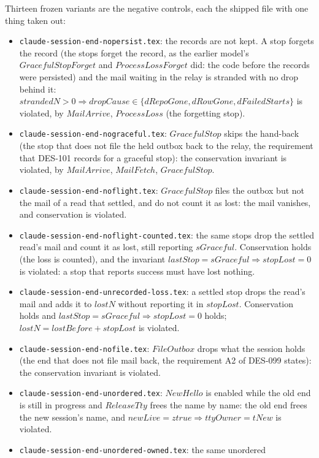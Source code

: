 \documentclass[a4paper,10pt,fleqn]{article}
\begin{document}
Thirteen frozen variants are the negative controls, each the shipped file with one
thing taken out:
\begin{itemize}
  \item \texttt{claude-session-end-nopersist.tex}: the records are not kept.  A stop forgets the
    record (the stops forget the record, as the earlier model's $GracefulStopForget$ and $ProcessLossForget$ did: the code before
    the records were persisted) and the mail waiting in the relay is stranded with no drop
    behind it: $strandedN > 0 \Rightarrow dropCause \in \{ dRepoGone, dRowGone, dFailedStarts \}$ is
    violated, by $MailArrive$, $ProcessLoss$ (the forgetting stop).
  \item \texttt{claude-session-end-nograceful.tex}: $GracefulStop$ skips the hand-back (the stop that does not file the held
    outbox back to the relay, the requirement that DES-101 records for a graceful
    stop): the conservation invariant is violated, by $MailArrive$, $MailFetch$,
    $GracefulStop$.
  \item \texttt{claude-session-end-noflight.tex}: $GracefulStop$
    files the outbox but not the mail of a read that settled, and do not count it as lost:
    the mail vanishes, and conservation is violated.
  \item \texttt{claude-session-end-noflight-counted.tex}: the same stops drop the settled read's
    mail and count it as lost, still reporting $sGraceful$.  Conservation holds (the loss is
    counted), and the invariant $lastStop = sGraceful \Rightarrow stopLost = 0$ is violated:
    a stop that reports success must have lost nothing.
  \item \texttt{claude-session-end-unrecorded-loss.tex}: a settled stop drops the read's mail
    and adds it to $lostN$ without reporting it in $stopLost$.  Conservation holds and
    $lastStop = sGraceful \Rightarrow stopLost = 0$ holds; $lostN = lostBefore + stopLost$ is
    violated.
  \item \texttt{claude-session-end-nofile.tex}: $FileOutbox$ drops what the session
    holds (the end that does not file mail back, the requirement A2 of DES-099
    states): the conservation invariant is violated.
  \item \texttt{claude-session-end-unordered.tex}: $NewHello$ is enabled while the
    old end is still in progress and $ReleaseTty$ frees the name by name: the old
    end frees the new session's name, and $newLive = ztrue \Rightarrow ttyOwner =
    tNew$ is violated.
  \item \texttt{claude-session-end-unordered-owned.tex}: the same unordered

\end{itemize}
\end{document}
